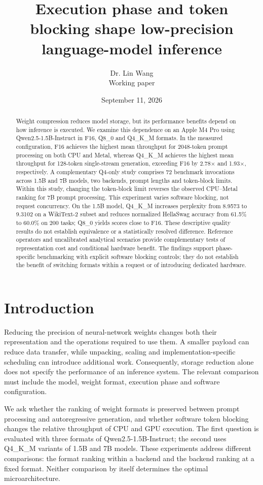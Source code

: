 \documentclass[11pt]{article}
\title{Execution phase and token blocking shape low-precision language-model inference}
\author{Dr. Lin Wang\\\small Working paper}
\date{September 11, 2026}
\begin{document}
\maketitle

\begin{abstract}
Weight compression reduces model storage, but its performance benefits depend on
how inference is executed. We examine this dependence on an Apple M4 Pro using
Qwen2.5-1.5B-Instruct in F16, Q8\_0 and Q4\_K\_M formats. In the measured
configuration, F16 achieves the highest mean throughput for 2048-token prompt
processing on both CPU and Metal, whereas Q4\_K\_M achieves the highest mean
throughput for 128-token single-stream generation, exceeding F16 by 2.78$\times$
and 1.93$\times$, respectively. A complementary Q4-only study comprises 72
benchmark invocations across 1.5B and 7B models, two backends, prompt lengths and
token-block limits. Within this study, changing the token-block limit reverses
the observed CPU--Metal ranking for 7B prompt processing. This experiment varies
software blocking, not request concurrency. On the 1.5B model, Q4\_K\_M increases
perplexity from 8.9573 to 9.3102 on a WikiText-2 subset and reduces normalized
HellaSwag accuracy from 61.5\% to 60.0\% on 200 tasks; Q8\_0 yields scores close
to F16. These descriptive quality results do not establish equivalence or a
statistically resolved difference. Reference operators and uncalibrated analytical
scenarios provide complementary tests of representation cost and conditional
hardware benefit. The findings support phase-specific benchmarking with explicit
software blocking controls; they do not establish the benefit of switching formats
within a request or of introducing dedicated hardware.

\end{abstract}

\section{Introduction}
Reducing the precision of neural-network weights changes both their representation
and the operations required to use them. A smaller payload can reduce data transfer,
while unpacking, scaling and implementation-specific scheduling can introduce
additional work. Consequently, storage reduction alone does not specify the
performance of an inference system. The relevant comparison must include the model,
weight format, execution phase and software configuration.

We ask whether the ranking of weight formats is preserved between prompt processing
and autoregressive generation, and whether software token blocking changes the
relative throughput of CPU and GPU execution. The first question is evaluated with
three formats of Qwen2.5-1.5B-Instruct; the second uses Q4\_K\_M variants of 1.5B
and 7B models. These experiments address different comparisons: the format ranking
within a backend and the backend ranking at a fixed format. Neither comparison by
itself determines the optimal microarchitecture.
\end{document}
